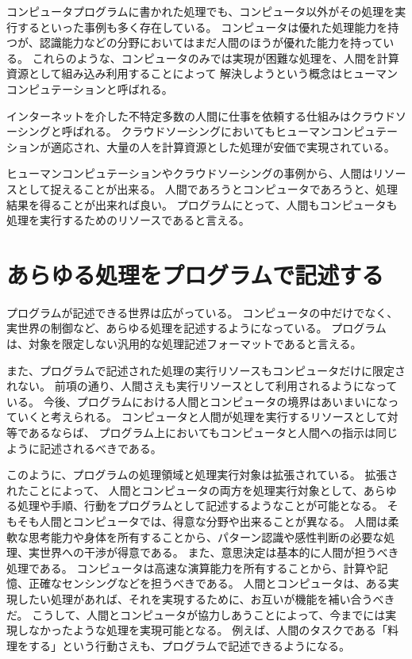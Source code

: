 コンピュータプログラムに書かれた処理でも、コンピュータ以外がその処理を実行するといった事例も多く存在している。
コンピュータは優れた処理能力を持つが、認識能力などの分野においてはまだ人間のほうが優れた能力を持っている。
これらのような、コンピュータのみでは実現が困難な処理を、人間を計算資源として組み込み利用することによって
解決しようという概念はヒューマンコンピュテーション\cite{humancomputation}と呼ばれる。

インターネットを介した不特定多数の人間に仕事を依頼する仕組みはクラウドソーシングと呼ばれる。
クラウドソーシングにおいてもヒューマンコンピュテーションが適応され、大量の人を計算資源とした処理が安価で実現されている。

ヒューマンコンピュテーションやクラウドソーシングの事例から、人間はリソースとして捉えることが出来る。
人間であろうとコンピュータであろうと、処理結果を得ることが出来れば良い。
プログラムにとって、人間もコンピュータも処理を実行するためのリソースであると言える。

\section{あらゆる処理をプログラムで記述する}\label{ux3042ux3089ux3086ux308bux51e6ux7406ux3092ux30d7ux30edux30b0ux30e9ux30e0ux3067ux8a18ux8ff0ux3059ux308b}

プログラムが記述できる世界は広がっている。
コンピュータの中だけでなく、実世界の制御など、あらゆる処理を記述するようになっている。
プログラムは、対象を限定しない汎用的な処理記述フォーマットであると言える。

また、プログラムで記述された処理の実行リソースもコンピュータだけに限定されない。
前項の通り、人間さえも実行リソースとして利用されるようになっている。
今後、プログラムにおける人間とコンピュータの境界はあいまいになっていくと考えられる。
コンピュータと人間が処理を実行するリソースとして対等であるならば、
プログラム上においてもコンピュータと人間への指示は同じように記述されるべきである。

このように、プログラムの処理領域と処理実行対象は拡張されている。
拡張されたことによって、
人間とコンピュータの両方を処理実行対象として、あらゆる処理や手順、行動をプログラムとして記述するようなことが可能となる。
そもそも人間とコンピュータでは、得意な分野や出来ることが異なる。
人間は柔軟な思考能力や身体を所有することから、パターン認識や感性判断の必要な処理、実世界への干渉が得意である。
また、意思決定は基本的に人間が担うべき処理である。
コンピュータは高速な演算能力を所有することから、計算や記憶、正確なセンシングなどを担うべきである。
人間とコンピュータは、ある実現したい処理があれば、それを実現するために、お互いが機能を補い合うべきだ。
こうして、人間とコンピュータが協力しあうことによって、今までには実現しなかったような処理を実現可能となる。
例えば、人間のタスクである「料理をする」という行動さえも、プログラムで記述できるようになる。

